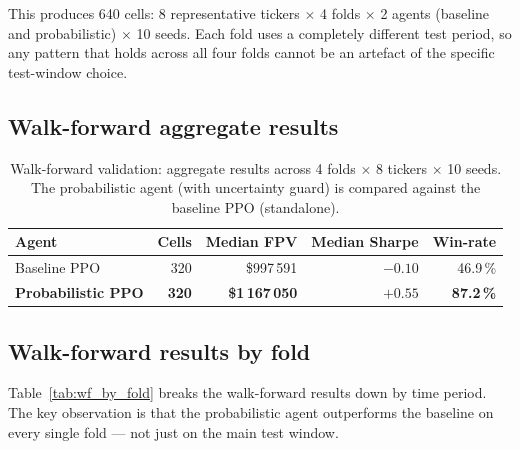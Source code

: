 This produces 640 cells: 8 representative tickers $\times$ 4 folds $\times$ 2 agents (baseline and probabilistic) $\times$ 10 seeds. Each fold uses a completely different test period, so any pattern that holds across all four folds cannot be an artefact of the specific test-window choice.

\subsection{Walk-forward aggregate results}

\begin{table}[h]
\centering
\caption{Walk-forward validation: aggregate results across 4 folds $\times$ 8 tickers $\times$ 10 seeds. The probabilistic agent (with uncertainty guard) is compared against the baseline PPO (standalone).}
\label{tab:wf_aggregate}
\small
\begin{tabular}{lrrrr}
\toprule
\textbf{Agent} & \textbf{Cells} & \textbf{Median FPV} & \textbf{Median Sharpe} & \textbf{Win-rate} \\
\midrule
Baseline PPO & 320 & \$997\,591 & $-0.10$ & 46.9\,\% \\
\textbf{Probabilistic PPO} & \textbf{320} & \textbf{\$1\,167\,050} & $\mathbf{+0.55}$ & \textbf{87.2\,\%} \\
\bottomrule
\end{tabular}
\end{table}

\subsection{Walk-forward results by fold}

Table~\ref{tab:wf_by_fold} breaks the walk-forward results down by time period. The key observation is that the probabilistic agent outperforms the baseline on every single fold --- not just on the main test window.

